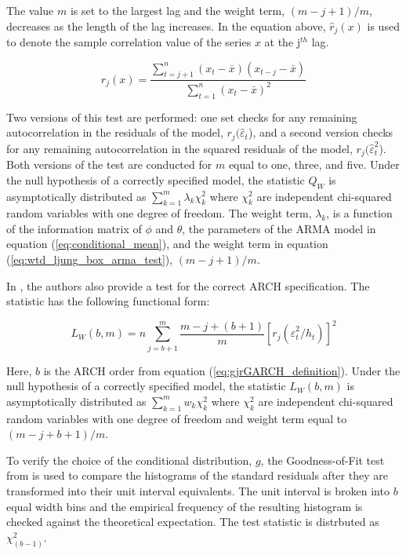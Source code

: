 \documentclass[12pt]{article}
\begin{document}
The value $m$ is set to the largest lag and the weight term, $(m - j + 1) / m$, decreases as the length of the lag increases. In the equation above, $\hat{r}_{j}(x)$ is used to denote the sample correlation value of the series $x$ at the j$^{th}$ lag.

\begin{equation} \label{eq:sample_correlation}
	r_{j}(x) = \frac{\sum_{t=j+1}^{n} (x_{t} - \bar{x}) (x_{t-j} - \bar{x})}{\sum_{t=1}^{n} (x_{t} - \bar{x})^{2}}
\end{equation}

Two versions of this test are performed: one set checks for any remaining autocorrelation in the residuals of the model, $r_{j}(\hat{\varepsilon}_{t}$), and a second version checks for any remaining autocorrelation in the squared residuals of the model, $r_{j}(\hat{\varepsilon}_{t}^{2}$). Both versions of the test are conducted for $m$ equal to one, three, and five. Under the null hypothesis of a correctly specified model, the statistic $Q_{W}$ is asymptotically distributed as $\sum_{k=1}^{m} \lambda_{k} \chi_{k}^{2}$ where $\chi_{k}^{2}$ are independent chi-squared random variables with one degree of freedom. The weight term, $\lambda_{k}$, is a function of the information matrix of $\phi$ and $\theta$, the parameters of the ARMA model in equation (\ref{eq:conditional_mean}), and the weight term in equation (\ref{eq:wtd_ljung_box_arma_test}), $(m - j + 1) / m$.

In \cite{Fisher_Gallagher_2012}, the authors also provide a test for the correct ARCH specification. The statistic has the following functional form:

\begin{equation}
	L_{W}(b,m) = n \sum_{j=b+1}^{m} \frac{m - j + (b + 1)}{m} [r_{j} \left( \hat{\varepsilon}_{t}^{2} / h_{t} \right)]^{2} 
\end{equation}

Here, $b$ is the ARCH order from equation (\ref{eq:gjrGARCH_definition}). Under the null hypothesis of a correctly specified model, the statistic $L_{W}(b,m)$ is asymptotically distributed as $\sum_{k=1}^{m} w_{k} \chi_{k}^{2}$ where $\chi_{k}^{2}$ are independent chi-squared random variables with one degree of freedom and weight term equal to $(m - j + b + 1) / m$.

To verify the choice of the conditional distribution, $g$, the Goodness-of-Fit test from \cite{VlaadPalm1993} is used to compare the histograms of the standard residuals after they are transformed into their unit interval equivalents. The unit interval is broken into $b$ equal width bins and the empirical frequency of the resulting histogram is checked against the theoretical expectation. The test statistic is distrbuted as $\chi^{2}_{(b-1)}$.
\end{document}
